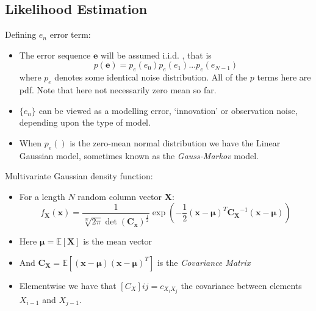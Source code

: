 \documentclass[12pt]{article}
\newcommand{\mexp}{\mathbb{E}}
\newcommand{\mub}{\boldsymbol{\mu}}
\begin{document}
\subsection{Likelihood Estimation} 
Defining $e_n$ error term:
\begin{itemize}
    \item The error sequence $\mathbf{e}$ will be assumed i.i.d. ,
    that is 
    \[
    p(\mathbf{e}) = p_e(e_0)p_e(e_1)...p_e(e_{N-1})
    \]
    where $p_e$ denotes some identical noise distribution. All of the $p$ terms here are pdf. Note that here not necessarily zero mean so far.
    \item $\{e_n \}$ can be viewed as a modelling error, `innovation' or observation noise, depending upon the type of model.
    \item When $p_e()$ is the zero-mean normal distribution we have the Linear Gaussian model, sometimes known as the \textit{Gauss-Markov} model.
\end{itemize}
Multivariate Gaussian density function:
\begin{itemize}
    \item For a length $N$ random column vector $\mathbf{X}$:
    \[
    f_\mathbf{{X}}\mathbf{(x)} = \frac{1}{\sqrt[N]{2\pi}\det{\mathbf{(C_x)}}^\frac{1}{2}}\exp\left(-\frac{1}{2}(\mathbf{x-\mub})^T\mathbf{C_X}^{-1}(\mathbf{x-\mub})\right)
    \]
    \item Here $\mub = \mexp[\mathbf{X}]$ is the mean vector
    \item And $\mathbf{C_X} = \mexp[(\mathbf{x-\mub})(\mathbf{x-\mub})^T]$ is the \textit{Covariance Matrix}
    \item Elementwise we have that $[C_X]{ij} = c_{X_i X_j}$ the covariance between elements $X_{i-1}$ and $X_{j-1}$.
\end{itemize}
\end{document}
